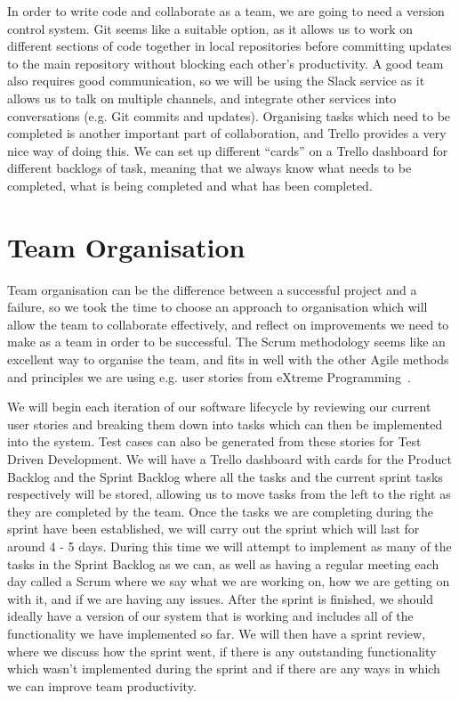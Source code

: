 In order to write code and collaborate as a team, we are going to need a version control system.
Git seems like a suitable option, as it allows us to work on different sections of code together in local repositories before committing updates to the main repository without blocking each other's productivity.
A good team also requires good communication, so we will be using the Slack service as it allows us to talk on multiple channels, and integrate other services into conversations (e.g. Git commits and updates).
Organising tasks which need to be completed is another important part of collaboration, and Trello provides a very nice way of doing this.
We can set up different “cards” on a Trello dashboard for different backlogs of task, meaning that we always know what needs to be completed, what is being completed and what has been completed.

\section{Team Organisation}

Team organisation can be the difference between a successful project and a failure, so we took the time to choose an approach to organisation which will allow the team to collaborate effectively, and reflect on improvements we need to make as a team in order to be successful.
The Scrum methodology seems like an excellent way to organise the team, and fits in well with the other Agile methods and principles we are using e.g. user stories from eXtreme Programming~\cite{sommerville2016software}.

We will begin each iteration of our software lifecycle by reviewing our current user stories and breaking them down into tasks which can then be implemented into the system.
Test cases can also be generated from these stories for Test Driven Development.
We will have a Trello dashboard with cards for the Product Backlog and the Sprint Backlog where all the tasks and the current sprint tasks respectively will be stored, allowing us to move tasks from the left to the right as they are completed by the team.
Once the tasks we are completing during the sprint have been established, we will carry out the sprint which will last for around 4 - 5 days.
During this time we will attempt to implement as many of the tasks in the Sprint Backlog as we can, as well as having a regular meeting each day called a Scrum where we say what we are working on, how we are getting on with it, and if we are having any issues.
After the sprint is finished, we should ideally have a version of our system that is working and includes all of the functionality we have implemented so far.
We will then have a sprint review, where we discuss how the sprint went, if there is any outstanding functionality which wasn't implemented during the sprint and if there are any ways in which we can improve team productivity. 

